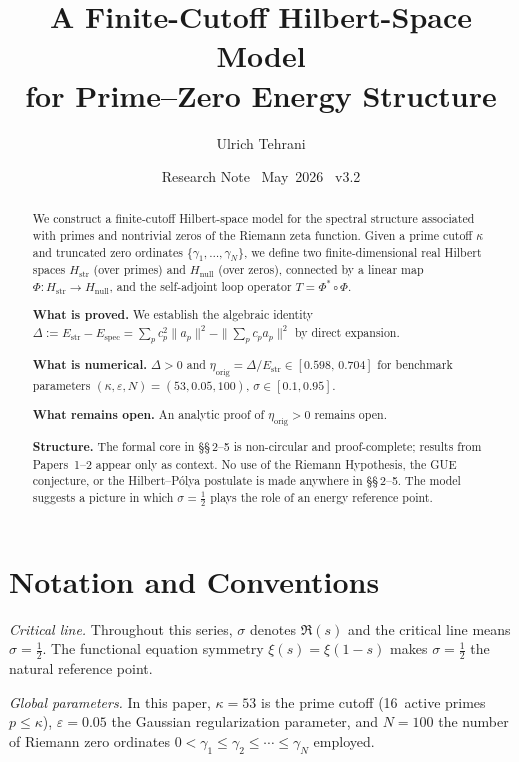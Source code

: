 \documentclass[11pt]{article}
\title{\vspace{-1.5em}\bfseries A Finite-Cutoff Hilbert-Space Model\\[0.4em]
\large for Prime--Zero Energy Structure}
\author{Ulrich Tehrani}
\date{Research Note \textperiodcentered\ May~2026 \textperiodcentered\ v3.2}
\newcommand{\Hstr}{H_{\mathrm{str}}}
\newcommand{\Hnull}{H_{\mathrm{null}}}
\newcommand{\Estr}{E_{\mathrm{str}}}
\newcommand{\Espec}{E_{\mathrm{spec}}}
\newcommand{\etaorig}{\eta_{\mathrm{orig}}}
\begin{document}
\maketitle

\begin{abstract}
We construct a finite-cutoff Hilbert-space model for the spectral structure
associated with primes and nontrivial zeros of the Riemann zeta function.
Given a prime cutoff $\kappa$ and truncated zero ordinates
$\{\gamma_1,\ldots,\gamma_N\}$, we define two finite-dimensional real
Hilbert spaces $\Hstr$ (over primes) and $\Hnull$ (over zeros),
connected by a linear map $\Phi\colon\Hstr\to\Hnull$, and the
self-adjoint loop operator $T = \Phi^*\circ\Phi$.

\textbf{What is proved.}
We establish the algebraic identity
$\Delta := \Estr - \Espec
 = \sum_p c_p^2\|a_p\|^2 - \|\sum_p c_p a_p\|^2$
by direct expansion.

\textbf{What is numerical.}
$\Delta > 0$ and
$\etaorig = \Delta/\Estr \in [0.598,\,0.704]$ for benchmark parameters
$(\kappa,\varepsilon,N)=(53,0.05,100)$, $\sigma\in[0.1,0.95]$.

\textbf{What remains open.}
An analytic proof of $\etaorig>0$ remains open.

\textbf{Structure.}
The formal core in \S\S\,2--5 is non-circular and proof-complete;
results from Papers~1--2 appear only as context.
No use of the Riemann Hypothesis, the GUE conjecture,
or the Hilbert--P\'olya postulate is made anywhere in \S\S\,2--5.
The model suggests a picture in which $\sigma=\tfrac12$ plays
the role of an energy reference point.
\end{abstract}

\vspace{2em}

\section*{Notation and Conventions}
\label{sec:notation}

\emph{Critical line.}
Throughout this series, $\sigma$ denotes $\Re(s)$ and the critical
line means $\sigma=\tfrac12$. The functional equation symmetry
$\xi(s)=\xi(1-s)$ makes $\sigma=\tfrac12$ the natural reference
point.

\medskip
\emph{Global parameters.}
In this paper, $\kappa=53$ is the prime cutoff (16~active primes
$p\leq\kappa$), $\varepsilon=0.05$ the Gaussian regularization
parameter, and $N=100$ the number of Riemann zero ordinates
$0<\gamma_1\leq\gamma_2\leq\cdots\leq\gamma_N$ employed.
\end{document}
